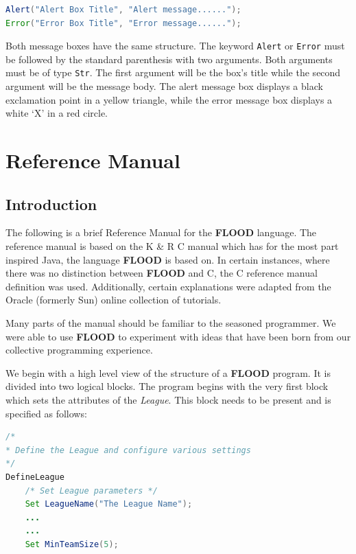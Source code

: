 \documentclass[12pt]{report}
\begin{document}
\begin{singlespace}
\begin{lstlisting}[language=Java,label=some-code,caption={Launching \texttt{Alert} and \texttt{Error} message boxes.}]
Alert("Alert Box Title", "Alert message......");
Error("Error Box Title", "Error message......");
\end{lstlisting}
\end{singlespace}

Both message boxes have the same structure. The keyword \texttt{Alert} or \texttt{Error} must be followed by the standard parenthesis with two arguments. Both arguments must be of type \texttt{Str}. The first argument will be the box's title while the second argument will be the message body. The alert message box displays a black exclamation point in a yellow triangle, while the error message box displays a white `X' in a red circle.

\chapter{Reference Manual}

\section{Introduction}

The following is a brief Reference Manual for the \textbf{FLOOD} language. The reference manual is based on the K \& R C manual which has for the most part inspired Java, the language \textbf{FLOOD} is based on. In certain instances, where there was no distinction between \textbf{FLOOD} and C, the C reference manual definition was used. Additionally, certain explanations were adapted from the Oracle (formerly Sun) online collection of tutorials.

Many parts of the manual should be familiar to the seasoned programmer. We were able to use \textbf{FLOOD} to experiment with ideas that have been born from our collective programming experience. 

We begin with a high level view of the structure of a \textbf{FLOOD} program. It is divided into two logical blocks. The program begins with the very first block which sets the attributes of the \textit{League}. This block needs to be present and is specified as follows:

\begin{singlespace}
\begin{lstlisting}[language=Java,label=some-code,caption={\texttt{DefineLeague}}]
/*
* Define the League and configure various settings
*/
DefineLeague
	/* Set League parameters */
	Set LeagueName("The League Name");
	...
	...
	Set MinTeamSize(5);
\end{lstlisting}
\end{singlespace}
\end{document}
